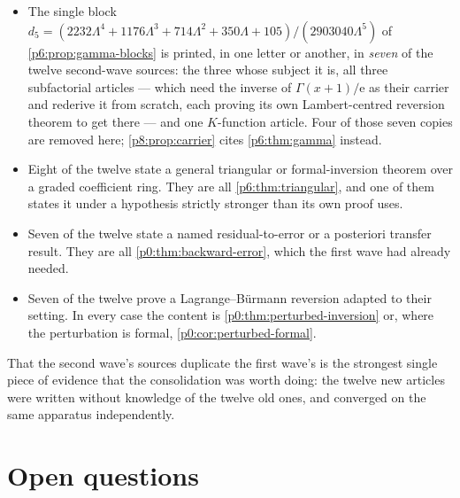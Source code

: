 \documentclass[11pt,a4paper,oneside]{book}
\theoremstyle{plain}
\theoremstyle{definition}
\theoremstyle{remark}
\newcommand{\e}{\mathrm{e}}
\begin{document}
\begin{itemize}
\item The single block
$d_5=(2232\Lambda^{4}+1176\Lambda^{3}+714\Lambda^{2}+350\Lambda+105)
/(2903040\Lambda^{5})$ of \cref{p6:prop:gamma-blocks} is printed, in one
letter or another, in \emph{seven} of the twelve second-wave sources: the
three whose subject it is, all three subfactorial articles --- which need the
inverse of $\Gamma(x+1)/\e$ as their carrier and rederive it from scratch,
each proving its own Lambert-centred reversion theorem to get there --- and
one $K$-function article.  Four of those seven copies are removed here;
\cref{p8:prop:carrier} cites \cref{p6:thm:gamma} instead.
\item Eight of the twelve state a general triangular or formal-inversion
theorem over a graded coefficient ring.  They are all
\cref{p6:thm:triangular}, and one of them states it under a hypothesis
strictly stronger than its own proof uses.
\item Seven of the twelve state a named residual-to-error or a posteriori
transfer result.  They are all \cref{p0:thm:backward-error}, which the first
wave had already needed.
\item Seven of the twelve prove a Lagrange--B\"urmann reversion adapted to
their setting.  In every case the content is
\cref{p0:thm:perturbed-inversion} or, where the perturbation is formal,
\cref{p0:cor:perturbed-formal}.
\end{itemize}

\noindent
That the second wave's sources duplicate the first wave's is the strongest
single piece of evidence that the consolidation was worth doing: the twelve
new articles were written without knowledge of the twelve old ones, and
converged on the same apparatus independently.

\section{Open questions}\label{p5:sec:open}
\end{document}
